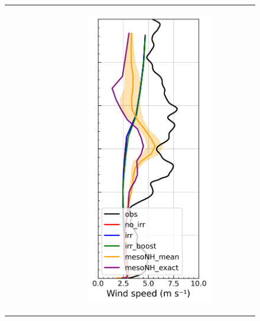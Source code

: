 \begin{figure}[hbtp]
{\begin{tabular}{@{}cccc@{}}
\begin{subfigure}[t]{0.289\textwidth}
        \end{subfigure} &
        \begin{subfigure}[t]{0.283\textwidth}
            \caption{}
            \includegraphics[width=\textwidth]{images/chap5/profiles/profile_elsplans_wind_speed_1507_.png}

\end{subfigure}
\end{tabular}}
\end{figure}
